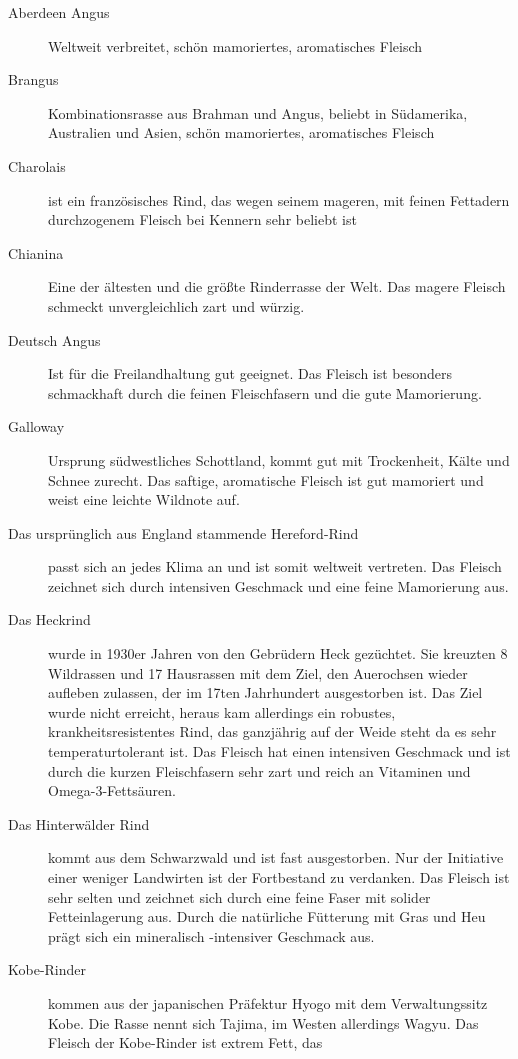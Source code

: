 \begin{description}
	\item[Aberdeen Angus] Weltweit verbreitet, schön mamoriertes, 
	aromatisches Fleisch
	\item[Brangus] Kombinationsrasse aus Brahman und Angus, beliebt in 
	Südamerika, Australien und Asien, schön mamoriertes, aromatisches 
	Fleisch
	\item[Charolais] ist ein französisches Rind, das wegen seinem 
	mageren, mit feinen Fettadern durchzogenem Fleisch bei Kennern sehr 
	beliebt ist
	\item[Chianina] Eine der ältesten und die größte Rinderrasse der Welt. 
	Das magere Fleisch schmeckt unvergleichlich zart und würzig.
	\item[Deutsch Angus] Ist für die Freilandhaltung gut geeignet. Das 
	Fleisch ist besonders schmackhaft durch die feinen Fleischfasern und 
	die gute Mamorierung.
	\item[Galloway] Ursprung südwestliches Schottland, kommt gut mit 
	Trockenheit, Kälte und Schnee zurecht. Das saftige, aromatische 
	Fleisch ist gut mamoriert und weist eine leichte Wildnote auf.
	\item [Das ursprünglich aus England stammende Hereford-Rind] passt 
	sich an jedes Klima an und ist somit weltweit vertreten. Das Fleisch 
	zeichnet sich durch intensiven Geschmack und eine feine Mamorierung 
	aus.
	\item [Das Heckrind] wurde in 1930er Jahren von den Gebrüdern Heck 
	gezüchtet. Sie kreuzten 8 Wildrassen und 17 Hausrassen mit dem Ziel, den 
	Auerochsen wieder aufleben zulassen, der im 17ten Jahrhundert 
	ausgestorben ist. Das Ziel wurde nicht erreicht, heraus kam allerdings ein 
	robustes, krankheitsresistentes Rind, das ganzjährig auf der Weide steht da 
	es sehr temperaturtolerant ist. Das Fleisch hat einen intensiven Geschmack 
	und ist durch die kurzen Fleischfasern sehr zart und reich an Vitaminen und 
	Omega-3-Fettsäuren.
	\item[Das Hinterwälder Rind] kommt aus dem Schwarzwald und ist fast 
	ausgestorben. Nur der Initiative einer weniger Landwirten ist der 
	Fortbestand zu verdanken. Das Fleisch ist sehr selten und zeichnet 
	sich durch eine feine Faser mit solider Fetteinlagerung aus. Durch die 
	natürliche Fütterung mit Gras und Heu prägt sich ein mineralisch 
	-intensiver Geschmack aus.
	\item[Kobe-Rinder] kommen aus der japanischen Präfektur Hyogo mit 
	dem Verwaltungssitz Kobe. Die Rasse nennt sich Tajima, im Westen 
	allerdings Wagyu. Das Fleisch der Kobe-Rinder ist extrem Fett, das 

\end{description}
